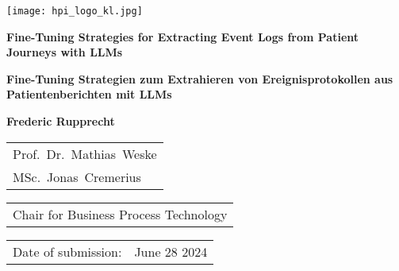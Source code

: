 \begin{titlepage}
	\begin{flushright}
		\texttt{[image: hpi\_logo\_kl.jpg]}
	\end{flushright}
	\begin{center}
		\hbox{}
		\vfill
		{\huge\bfseries Fine-Tuning Strategies for Extracting Event Logs from Patient Journeys with LLMs \par}
		\vskip 0.5cm
		{\huge\bfseries Fine-Tuning Strategien zum Extrahieren von Ereignisprotokollen aus Patientenberichten mit LLMs \par}
		\vskip 1.5cm
		\textbf{Frederic Rupprecht}\\
		\vskip 1.5cm
		\begin{tabular}{l}
			Prof.~Dr.~Mathias~Weske \\
			MSc.~Jonas~Cremerius \\
		\end{tabular}
		\vskip 0.25cm
		\begin{tabular}{l}
			Chair for  Business Process Technology
		\end{tabular}
		\vskip 1.5cm
		\begin{tabular}{ll}
			Date of submission: & June 28 2024 \\
		\end{tabular}
	\end{center}	
	\vfill
\end{titlepage}

